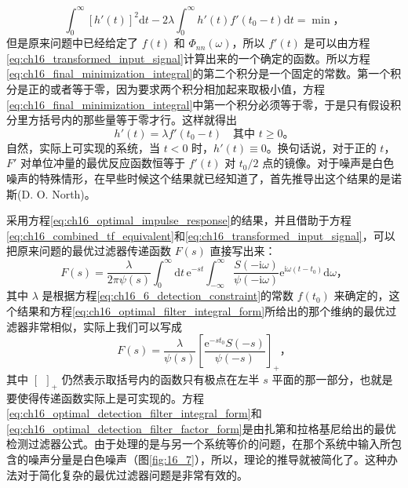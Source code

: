 \begin{equation}
\int_{0}^{\infty}\left[h'(t)\right]^2\mathrm{d}t - 2\lambda\int_{0}^{\infty} h'(t)f'(t_0-t)\mathrm{d}t = \min，
\label{eq:ch16_final_minimization_integral}
\end{equation}
但是原来问题中已经给定了 $f(t)$ 和 $\Phi_{nn}(\omega)$，所以 $f'(t)$ 是可以由方程\eqref{eq:ch16_transformed_input_signal}计算出来的一个确定的函数。所以方程\eqref{eq:ch16_final_minimization_integral}的第二个积分是一个固定的常数。第一个积分是正的或者等于零，因为要求两个积分相加起来取极小值，方程\eqref{eq:ch16_final_minimization_integral}中第一个积分必须等于零，于是只有假设积分里方括号内的那些量等于零才行。这样就得出
\begin{equation}
h'(t) = \lambda f'(t_0-t) \quad \text{其中 } t\ge0。
\label{eq:ch16_optimal_impulse_response}
\end{equation}
自然，实际上可实现的系统，当 $t<0$ 时，$h'(t)\equiv0$。换句话说，对于正的 $t$，$F'$ 对单位冲量的最优反应函数恒等于 $f'(t)$ 对 $t_0/2$ 点的镜像。对于噪声是白色噪声的特殊情形，在早些时候这个结果就已经知道了，首先推导出这个结果的是诺斯(D. O. North)。

采用方程\eqref{eq:ch16_optimal_impulse_response}的结果，并且借助于方程\eqref{eq:ch16_combined_tf_equivalent}和\eqref{eq:ch16_transformed_input_signal}，可以把原来问题的最优过滤器传递函数 $F(s)$ 直接写出来：
\begin{equation}
F(s) = \frac{\lambda}{2\pi\psi(s)}\int_{0}^{\infty}\mathrm{d}t\,\mathrm{e}^{-st}\int_{-\infty}^{\infty} \frac{S(-\mathrm{i}\omega)}{\psi(-\mathrm{i}\omega)}\mathrm{e}^{\mathrm{i}\omega(t-t_0)}\mathrm{d}\omega，
\label{eq:ch16_optimal_detection_filter_integral_form}
\end{equation}
其中 $\lambda$ 是根据方程\eqref{eq:ch16_6_detection_constraint}的常数 $f(t_0)$ 来确定的，这个结果和方程\eqref{eq:ch16_optimal_filter_integral_form}所给出的那个维纳的最优过滤器非常相似，实际上我们可以写成
\begin{equation}
F(s) = \frac{\lambda}{\psi(s)}\left[\frac{\mathrm{e}^{-st_0}S(-s)}{\psi(-s)}\right]_+，
\label{eq:ch16_optimal_detection_filter_factor_form}
\end{equation}
其中 $[\ \ ]_+$ 仍然表示取括号内的函数只有极点在左半 $s$ 平面的那一部分，也就是要使得传递函数实际上是可实现的。方程\eqref{eq:ch16_optimal_detection_filter_integral_form}和\eqref{eq:ch16_optimal_detection_filter_factor_form}是由扎第和拉格基尼给出的最优检测过滤器公式。由于处理的是与另一个系统等价的问题，在那个系统中输入所包含的噪声分量是白色噪声（图\ref{fig:16_7}），所以，理论的推导就被简化了。这种办法对于简化复杂的最优过滤器问题是非常有效的。

